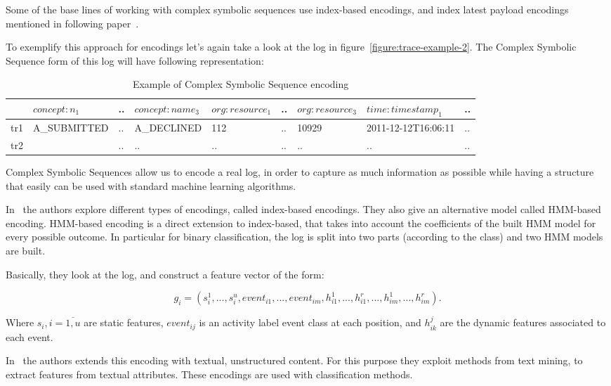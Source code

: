 Some of the base lines of working with complex symbolic sequences use index-based encodings, and index latest payload encodings mentioned in following paper~\cite{Leontjeva2015}.   

To exemplify this approach for encodings let's again take a look at the log in figure~\ref{figure:trace-example-2}. The Complex Symbolic Sequence form of this log will have following representation:

\begin{table}[h]
	\centering
	\begin{tabular}{| l | l | l | l | l | l | l | l | l |}
		\hline
		& $concept:n_{1}$ & .. & $concept:name_{3}$ & $org:resource_{1}$ & .. & $org:resource_{3}$ & $time:timestamp_{1}$ & .. \\	
		\hline
		tr1 & A\_SUBMITTED & .. & A\_DECLINED &  112 & .. & 10929 &  2011-12-12T16:06:11 & ..  \\
		tr2 &  & .. & .. & .. & .. & ..  & .. & ..  \\
		\hline
	\end{tabular}
	\caption{Example of Complex Symbolic Sequence encoding}
	\label{tab:complesymbseq_log_example}
\end{table}

Complex Symbolic Sequences allow us to encode a real log, in order to capture as much information as possible while having a structure that easily can be used with standard machine learning algorithms.

In~\cite{Leontjeva2015} the authors explore different types of encodings, called index-based encodings. They also give an alternative model called HMM-based encoding. HMM-based encoding is a direct extension to index-based, that takes into account the coefficients of the built HMM model for every possible outcome. In particular for binary classification, the log is split into two parts (according to the class) and two HMM models are built.

Basically, they look at the log, and construct a feature vector of the form:

\[g_i = (s_i^1,...,s_i^u,event_{i1},...,event_{im},h_{i1}^1,...,h_{i1}^r,...,h_{im}^1,...,h_{im}^r).\]

Where $s_i, i=\overline{1,u}$ are static features, $event_{ij}$ is an activity label event class at each position, and $h_{ik}^{j}$ are the dynamic features associated to each event. 

In~\cite{DBLP:conf/bpm/TeinemaaDMF16} the authors extends this encoding with textual, unstructured content. For this purpose they exploit methods from text mining, to extract features from textual attributes. These encodings are used with classification methods.

